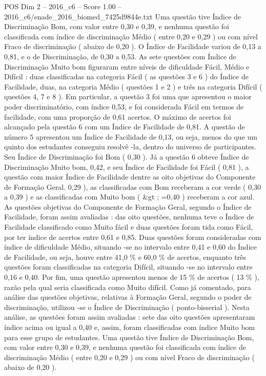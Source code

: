 \begin{textsample}{POS Dim 2 – 2016\_c6 – Score 1.00 – 2016\_c6/enade\_2016\_biomed\_7425d9844e.txt}
Uma questão tive Índice de Discriminação Bom, com valor entre 0,30 e 0,39, e nenhuma questão foi classificada com índice de discriminação Médio ( entre 0,20 e 0,29 ) ou com nível Fraco de discriminação ( abaixo de 0,20 ).
O Índice de Facilidade variou de 0,13 a 0,81, e o de Discriminação, de 0,30 a 0,53.
As sete questões com Índice de Discriminação Muito bom figuraram entre níveis de dificuldade Fácil, Médio e Difícil : duas classificadas na categoria Fácil ( as questões 3 e 6 ) do Índice de Facilidade, duas, na categoria Médio ( questões 1 e 2 ) e três na categoria Difícil ( questões 4, 7 e 8 ).
Em particular, a questão 3 foi uma que apresentou o maior poder discriminatório, com índice 0,53, e foi considerada Fácil em termos de facilidade, com uma proporção de 0,61 acertos.
O máximo de acertos foi alcançado pela questão 6 com um Índice de Facilidade de 0,81.
A questão de número 5 apresentou um Índice de Facilidade de 0,13, ou seja, menos do que um quinto dos estudantes conseguiu resolvê -la, dentro do universo de participantes.
Seu Índice de Discriminação foi Bom ( 0,30 ).
Já a questão 6 obteve Índice de Discriminação Muito bom, 0,42, e seu Índice de Facilidade foi Fácil ( 0,81 ), a questão com maior Índice de Facilidade dentre as oito objetivas do Componente de Formação Geral. 0,29 ), as classificadas com Bom receberam a cor verde ( 0,30 a 0,39 ) e as classificadas com Muito bom ( \&gt ; =0,40 ) receberam a cor azul.
As questões objetivas do Componente de Formação Geral, segundo o Índice de Facilidade, foram assim avaliadas : das oito questões, nenhuma teve o Índice de Facilidade classificado como Muito fácil e duas questões foram tida como Fácil, por ter índice de acertos entre 0,61 e 0,85.
Duas questões foram consideradas com índice de dificuldade Médio, situando -se no intervalo entre 0,41 e 0,60 do Índice de Facilidade, ou seja, houve entre 41,0 \% e 60,0 \% de acertos, enquanto três questões foram classificadas na categoria Difícil, situando -se no intervalo entre 0,16 e 0,40.
Por fim, uma questão apresentou menos de 15 \% de acertos ( 13 \% ), razão pela qual seria classificada como Muito difícil.
Como já comentado, para análise das questões objetivas, relativas à Formação Geral, segundo o poder de discriminação, utilizou -se o Índice de Discriminação ( ponto-bisserial ).
Nesta análise, as questões foram assim avaliadas : sete das oito questões apresentaram índice acima ou igual a 0,40 e, assim, foram classificadas com índice Muito bom para esse grupo de estudantes.
Uma questão tive Índice de Discriminação Bom, com valor entre 0,30 e 0,39, e nenhuma questão foi classificada com índice de discriminação Médio ( entre 0,20 e 0,29 ) ou com nível Fraco de discriminação ( abaixo de 0,20 ).

\end{textsample}
